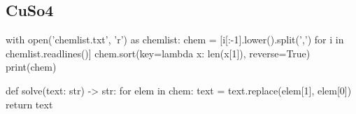\documentclass[12pt]{article}
\begin{document}
%
%
%
    \subsection{CuSo4}

    \begin{pythoncode}
with open('chemlist.txt', 'r') as chemlist:
    chem = [i[:-1].lower().split(',') for i in chemlist.readlines()]
chem.sort(key=lambda x: len(x[1]), reverse=True)
print(chem)

def solve(text: str) -> str:
    for elem in chem:
        text = text.replace(elem[1], elem[0])
    return text
    \end{pythoncode}
\end{document}
